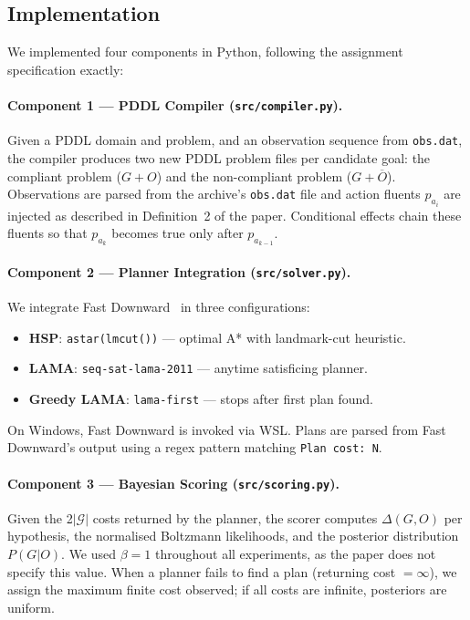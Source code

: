 \documentclass[10pt,twocolumn]{article}
\begin{document}
\subsection{Implementation}

We implemented four components in Python, following the assignment specification exactly:

\paragraph{Component 1 — PDDL Compiler (\texttt{src/compiler.py}).}
Given a PDDL domain and problem, and an observation sequence from \texttt{obs.dat}, the compiler produces two new PDDL problem files per candidate goal: the compliant problem ($G{+}O$) and the non-compliant problem ($G{+}\overline{O}$). Observations are parsed from the archive's \texttt{obs.dat} file and action fluents $p_{a_i}$ are injected as described in Definition~2 of the paper. Conditional effects chain these fluents so that $p_{a_k}$ becomes true only after $p_{a_{k-1}}$.

\paragraph{Component 2 — Planner Integration (\texttt{src/solver.py}).}
We integrate Fast Downward~\cite{helmert2006fast} in three configurations:
\begin{itemize}
  \item \textbf{HSP}: \texttt{astar(lmcut())} — optimal A* with landmark-cut heuristic.
  \item \textbf{LAMA}: \texttt{seq-sat-lama-2011} — anytime satisficing planner.
  \item \textbf{Greedy LAMA}: \texttt{lama-first} — stops after first plan found.
\end{itemize}
On Windows, Fast Downward is invoked via WSL. Plans are parsed from Fast Downward's output using a regex pattern matching \texttt{Plan cost:~N}.

\paragraph{Component 3 — Bayesian Scoring (\texttt{src/scoring.py}).}
Given the 2$|\mathcal{G}|$ costs returned by the planner, the scorer computes $\Delta(G, O)$ per hypothesis, the normalised Boltzmann likelihoods, and the posterior distribution $P(G|O)$. We used $\beta = 1$ throughout all experiments, as the paper does not specify this value. When a planner fails to find a plan (returning cost $= \infty$), we assign the maximum finite cost observed; if all costs are infinite, posteriors are uniform.
\end{document}

